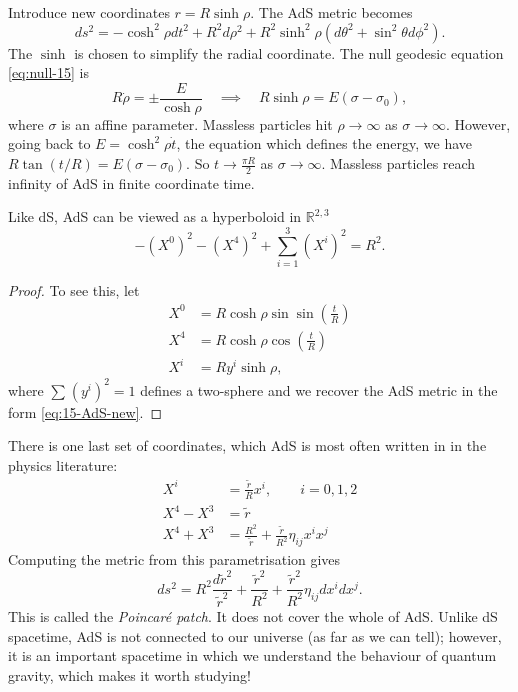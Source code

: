 Introduce new coordinates $r = R\sinh \rho$. The AdS metric becomes
\begin{equation}
  \label{eq:15-AdS-new}
  ds^2 = -\cosh^2\rho dt^2 + R^2 d\rho^2 + R^2 \sinh^2\rho (d\theta^2 + \sin^2\theta d\phi^2).
\end{equation}
The $\sinh$ is chosen to simplify the radial coordinate.
The null geodesic equation \eqref{eq:null-15} is
\begin{equation}
  R \dot{\rho} = \pm \frac{E}{\cosh\rho} \quad\implies\quad R \sinh\rho = E (\sigma - \sigma_0),
\end{equation}
where $\sigma$ is an affine parameter.
Massless particles hit $\rho \to \infty$ as $\sigma \to \infty$.
However, going back to $E = \cosh^2\rho \dot{t}$, the equation which defines the energy, we have $R \tan(t/R) = E (\sigma - \sigma_0)$.
So $t \to \frac{\pi R}{2}$ as $\sigma \to \infty$. Massless particles reach infinity of AdS in finite coordinate time.
\begin{claim}
  Like dS, AdS can be viewed as a hyperboloid in $\mathbb{R}^{2, 3}$
  \begin{equation}
    -(X^0)^2 - (X^4)^2 + \sum_{i=1}^{3}(X^{i})^2 = R^2.
  \end{equation}
\end{claim}
\begin{proof}
  To see this, let
  \begin{subequations}
    \begin{align}
      X^0 &= R \cosh \rho \sin \sin(\frac{t}{R}) \\
      X^4 &= R \cosh \rho \cos(\frac{t}{R}) \\
      X^{i} &= R y^{i} \sinh\rho,
    \end{align}
  \end{subequations}
  where $\sum_{}^{} (y^{i})^2 = 1$ defines a two-sphere and we recover the AdS metric in the form \eqref{eq:15-AdS-new}. 
\end{proof}
There is one last set of coordinates, which AdS is most often written in in the physics literature:
\begin{subequations}
  \begin{align}
    X^{i} &= \frac{\widetilde{r}}{R} x^{i}, \qquad i = 0,1,2   \\
    X^4 - X^3 &= \widetilde{r} \\
    X^4 + X^3 &= \frac{R^2}{\widetilde{r}} + \frac{\widetilde{r}}{R^2} \eta_{ij} x^{i} x^{j}
  \end{align}
\end{subequations}
Computing the metric from this parametrisation gives
\begin{equation}
  ds^2 = R^2 \frac{d\widetilde{r}^2}{\widetilde{r}^2} + \frac{\widetilde{r}^2}{R^2} + \frac{\widetilde{r}^2}{R^2} \eta_{ij} dx^{i} dx^{j}.
\end{equation}
This is called the \emph{Poincar\'e patch}. It does not cover the whole of AdS. 
Unlike dS spacetime, AdS is not connected to our universe (as far as we can tell); however, it is an important spacetime in which we understand the behaviour of quantum gravity, which makes it worth studying!
